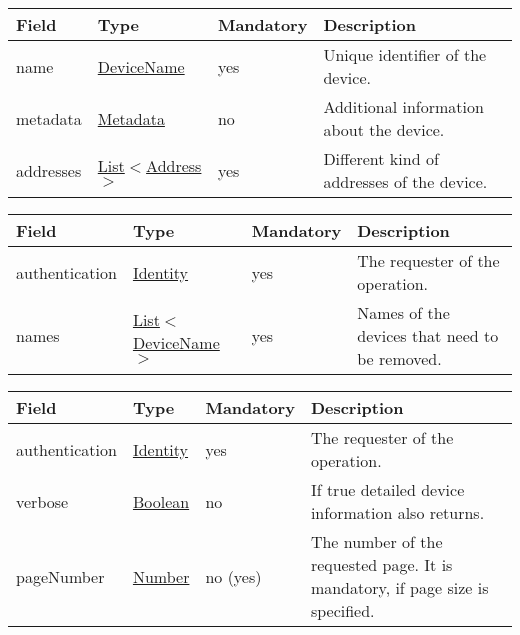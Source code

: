 \documentclass[a4paper]{arrowhead}
\newcommand{\pref}[1]{{\textcolor{ArrowheadGrey}{\hyperref[sec:model:primitives:#1]{#1}}}}
\begin{document}
 
\begin{table}[ht!]
\begin{tabularx}{\textwidth}{| p{2.5cm} | p{2.5cm} | p{2cm} | X |} \hline
\rowcolor{gray!33} Field & Type & Mandatory & Description \\ \hline
name & \pref{DeviceName} & yes & Unique identifier of the device. \\ \hline
metadata &\hyperref[sec:model:Metadata]{Metadata} & no & Additional information about the device. \\ \hline
addresses &  \pref{List}$<$\pref{Address}$>$ & yes & Different kind of addresses of the device.  \\ \hline
\end{tabularx}
\end{table}


\begin{table}[ht!]
\begin{tabularx}{\textwidth}{| p{2.5cm} | p{3.5cm} | p{2cm} | X |} \hline
\rowcolor{gray!33} Field & Type & Mandatory & Description \\ \hline
authentication & \hyperref[sec:model:Identity]{Identity} & yes & The requester of the operation. \\ \hline
names &  \pref{List}$<$\pref{DeviceName}$>$ & yes & Names of the devices that need to be removed. \\ \hline
\end{tabularx}
\end{table}


\begin{table}[ht!]
\begin{tabularx}{\textwidth}{| p{4.3cm} | p{4.8cm} | p{2cm} | X |} \hline
\rowcolor{gray!33} Field & Type & Mandatory & Description \\ \hline
authentication & \hyperref[sec:model:Identity]{Identity} & yes & The requester of the operation. \\ \hline
verbose & \pref{Boolean} & no & If true detailed device information also returns. \\ \hline
pageNumber & \pref{Number} & no (yes) & The number of the requested page. It is mandatory, if page size is specified. \\ \hline
\end{tabularx}
\end{table}
\end{document}
